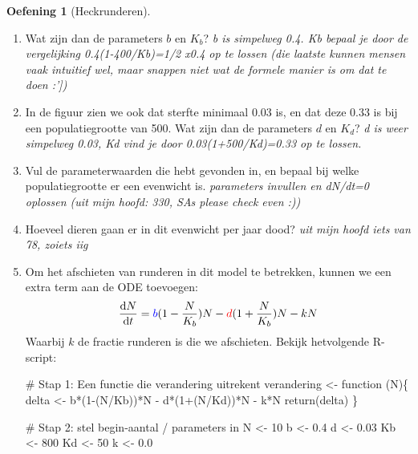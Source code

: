 \documentclass[
  a4paper,
]{scrbook}
\newenvironment{Shaded}{\begin{snugshade}}{\end{snugshade}}
\newcommand{\CommentTok}[1]{\textcolor[rgb]{0.37,0.37,0.37}{#1}}
\newcommand{\ControlFlowTok}[1]{\textcolor[rgb]{0.00,0.23,0.31}{#1}}
\newcommand{\DecValTok}[1]{\textcolor[rgb]{0.68,0.00,0.00}{#1}}
\newcommand{\FloatTok}[1]{\textcolor[rgb]{0.68,0.00,0.00}{#1}}
\newcommand{\FunctionTok}[1]{\textcolor[rgb]{0.28,0.35,0.67}{#1}}
\newcommand{\NormalTok}[1]{\textcolor[rgb]{0.00,0.23,0.31}{#1}}
\newcommand{\OtherTok}[1]{\textcolor[rgb]{0.00,0.23,0.31}{#1}}
\newcommand{\SpecialCharTok}[1]{\textcolor[rgb]{0.37,0.37,0.37}{#1}}
\theoremstyle{definition}
\newtheorem{exercise}{Oefening}[chapter]
\theoremstyle{remark}
\begin{document}
\begin{exercise}[Heckrunderen]
\begin{enumerate}
\def\labelenumi{\alph{enumi}.}
\setcounter{enumi}{1}
\item
  Wat zijn dan de parameters \(b\) en \(K_b\)? \emph{b is simpelweg 0.4.
  Kb bepaal je door de vergelijking 0.4(1-400/Kb)=1/2 x0.4 op te lossen
  (die laatste kunnen mensen vaak intuitief wel, maar snappen niet wat
  de formele manier is om dat te doen :'{]})}
\item
  In de figuur zien we ook dat sterfte minimaal 0.03 is, en dat deze
  0.33 is bij een populatiegrootte van 500. Wat zijn dan de parameters
  \(d\) en \(K_d\)? \emph{d is weer simpelweg 0.03, Kd vind je door
  0.03(1+500/Kd)=0.33 op te lossen.}
\item
  Vul de parameterwaarden die hebt gevonden in, en bepaal bij welke
  populatiegrootte er een evenwicht is. \emph{parameters invullen en
  dN/dt=0 oplossen (uit mijn hoofd: 330, SAs please check even :)) }
\item
  Hoeveel dieren gaan er in dit evenwicht per jaar dood? \emph{uit mijn
  hoofd iets van 78, zoiets iig}
\item
  Om het afschieten van runderen in dit model te betrekken, kunnen we
  een extra term aan de ODE toevoegen: \[
    \frac{\mathrm{d}N}{\mathrm{d}t} = \color{blue}b\color{black}(1-\frac{N}{K_b})N - \color{red}d\color{black}(1+\frac{N}{K_b})N - kN
    \] Waarbij \(k\) de fractie runderen is die we afschieten. Bekijk
  hetvolgende R-script:

\begin{Shaded}
\begin{Highlighting}[]
\CommentTok{\# Stap 1: Een functie die verandering uitrekent}
\NormalTok{verandering }\OtherTok{\textless{}{-}} \ControlFlowTok{function}\NormalTok{ (N)\{}
\NormalTok{  delta }\OtherTok{\textless{}{-}}\NormalTok{ b}\SpecialCharTok{*}\NormalTok{(}\DecValTok{1}\SpecialCharTok{{-}}\NormalTok{(N}\SpecialCharTok{/}\NormalTok{Kb))}\SpecialCharTok{*}\NormalTok{N }\SpecialCharTok{{-}}\NormalTok{ d}\SpecialCharTok{*}\NormalTok{(}\DecValTok{1}\SpecialCharTok{+}\NormalTok{(N}\SpecialCharTok{/}\NormalTok{Kd))}\SpecialCharTok{*}\NormalTok{N }\SpecialCharTok{{-}}\NormalTok{ k}\SpecialCharTok{*}\NormalTok{N}
  \FunctionTok{return}\NormalTok{(delta)}
\NormalTok{\}}

\CommentTok{\# Stap 2: stel begin{-}aantal / parameters in}
\NormalTok{N }\OtherTok{\textless{}{-}} \DecValTok{10}
\NormalTok{b }\OtherTok{\textless{}{-}} \FloatTok{0.4}    
\NormalTok{d }\OtherTok{\textless{}{-}} \FloatTok{0.03}
\NormalTok{Kb }\OtherTok{\textless{}{-}} \DecValTok{800}
\NormalTok{Kd }\OtherTok{\textless{}{-}} \DecValTok{50}
\NormalTok{k }\OtherTok{\textless{}{-}} \FloatTok{0.0}


\end{Highlighting}
\end{Shaded}
\end{enumerate}
\end{exercise}
\end{document}
